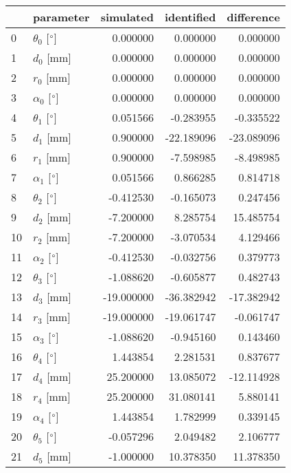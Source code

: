 \documentclass{standalone}%
\begin{document}
%
\normalsize%
\begin{tabular}{llrrr}
\toprule
{} &                 parameter &  simulated & identified & difference \\
\midrule
0  &  $\theta_{0}$ [$\degree$] &   0.000000 &   0.000000 &   0.000000 \\
1  &              $d_{0}$ [mm] &   0.000000 &   0.000000 &   0.000000 \\
2  &              $r_{0}$ [mm] &   0.000000 &   0.000000 &   0.000000 \\
3  &  $\alpha_{0}$ [$\degree$] &   0.000000 &   0.000000 &   0.000000 \\
4  &  $\theta_{1}$ [$\degree$] &   0.051566 &  -0.283955 &  -0.335522 \\
5  &              $d_{1}$ [mm] &   0.900000 & -22.189096 & -23.089096 \\
6  &              $r_{1}$ [mm] &   0.900000 &  -7.598985 &  -8.498985 \\
7  &  $\alpha_{1}$ [$\degree$] &   0.051566 &   0.866285 &   0.814718 \\
8  &  $\theta_{2}$ [$\degree$] &  -0.412530 &  -0.165073 &   0.247456 \\
9  &              $d_{2}$ [mm] &  -7.200000 &   8.285754 &  15.485754 \\
10 &              $r_{2}$ [mm] &  -7.200000 &  -3.070534 &   4.129466 \\
11 &  $\alpha_{2}$ [$\degree$] &  -0.412530 &  -0.032756 &   0.379773 \\
12 &  $\theta_{3}$ [$\degree$] &  -1.088620 &  -0.605877 &   0.482743 \\
13 &              $d_{3}$ [mm] & -19.000000 & -36.382942 & -17.382942 \\
14 &              $r_{3}$ [mm] & -19.000000 & -19.061747 &  -0.061747 \\
15 &  $\alpha_{3}$ [$\degree$] &  -1.088620 &  -0.945160 &   0.143460 \\
16 &  $\theta_{4}$ [$\degree$] &   1.443854 &   2.281531 &   0.837677 \\
17 &              $d_{4}$ [mm] &  25.200000 &  13.085072 & -12.114928 \\
18 &              $r_{4}$ [mm] &  25.200000 &  31.080141 &   5.880141 \\
19 &  $\alpha_{4}$ [$\degree$] &   1.443854 &   1.782999 &   0.339145 \\
20 &  $\theta_{5}$ [$\degree$] &  -0.057296 &   2.049482 &   2.106777 \\
21 &              $d_{5}$ [mm] &  -1.000000 &  10.378350 &  11.378350 \\

\end{tabular}
\end{document}
